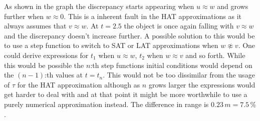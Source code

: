 \documentclass[%
aip,
jmp,
amsmath,amssymb,
reprint,%
]{revtex4-1}
\begin{document}
\begin{center}
	\end{center}
	As shown in the graph the discrepancy starts appearing when $u \approx w$ and grows further when $w \approx 0$. This is a inherent fault in the HAT approximations as it always assumes that $v \approx w$. At $t = 2.5$ the object is once again falling with $v \approx w$ and the discrepancy doesn't increase further. A possible solution to this would be to use a step function to switch to SAT or LAT approximations when $w \not\approx v$. One could derive expressions for $t_1$ when $u \approx w$, $t_2$ when $w \approx v$ and so forth. While this would be possible the $n$:th step functions initial conditions would depend on the $(n-1)$:th values at $t=t_n$. This would not be too dissimilar from the usage of $\tau$ for the HAT approximation although as $n$ grows larger the expressions would get harder to deal with and at that point it might be more worthwhile to use a purely numerical approximation instead. The difference in range is $0.23\,m = 7.5\,\%$.
\end{document}
